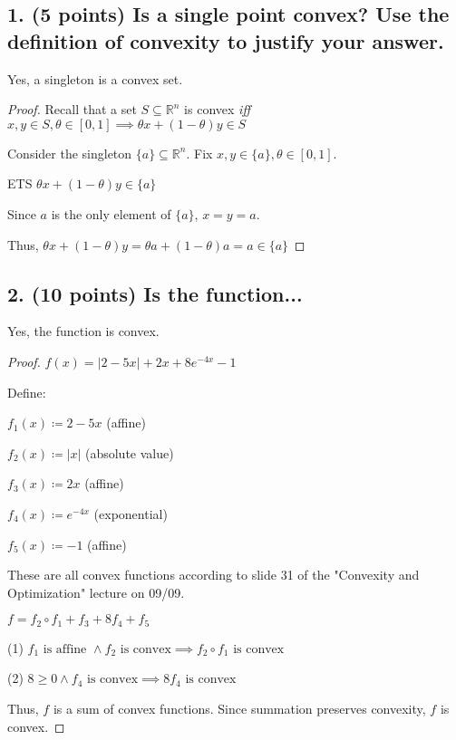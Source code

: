 \documentclass[a4paper,10pt]{article}
\theoremstyle{definition}
\begin{document}
\subsection*{1. (5 points) Is a single point convex? Use the definition of convexity to justify your answer.}

Yes, a singleton is a convex set.

\begin{proof} 
Recall that a set $S \subseteq \mathbb{R}^n$ is convex \textit{iff}
$x, y \in S, \theta \in [0, 1] \implies \theta x + (1 - \theta) y \in S$

Consider the singleton $\{a\}\subseteq\mathbb{R}^n$. Fix $x, y \in \{a\}, \theta \in [0,1]$.

ETS $\theta x + (1 - \theta) y \in \{a\}$

Since $a$ is the only element of $\{a\}$, $x = y = a$.

Thus, $\theta x + (1 - \theta) y = \theta a + (1 - \theta) a = a \in \{a\}$
\end{proof} 

\bigskip
\subsection*{2. (10 points) Is the function...}

Yes, the function is convex.

\begin{proof}

$f(x) = \lvert 2 - 5x\rvert + 2x + 8e^{-4x} - 1$

Define:

$f_1(x) \coloneq 2 - 5x$ (affine)

$f_2(x) \coloneq \lvert x \rvert$ (absolute value)

$f_3(x) \coloneq 2x$ (affine)

$f_4(x) \coloneq e^{-4x}$ (exponential)

$f_5(x) \coloneq - 1$ (affine)

These are all convex functions according to slide 31 of the "Convexity and Optimization" lecture on 09/09.

$f = f_2 \circ f_1 + f_3 + 8f_4 + f_5$

(1) $f_1 \text{ is affine } \land f_2 \text{ is convex} \implies f_2 \circ f_1 \text{ is convex}$

(2) $8 \geq 0 \land f_4 \text{ is convex} \implies 8f_4 \text{ is convex}$

Thus, $f$ is a sum of convex functions.
Since summation preserves convexity, $f$ is convex.
\end{proof}
\end{document}
